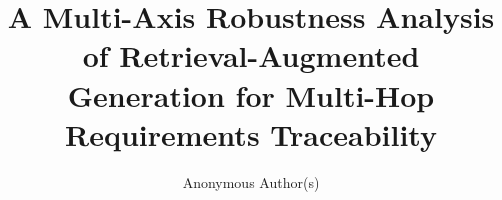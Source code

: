 \documentclass[runningheads]{llncs}
\begin{document}
\title{A Multi-Axis Robustness Analysis of Retrieval-Augmented Generation
  for Multi-Hop Requirements Traceability}

\author{Anonymous Author(s)}

\maketitle












\end{document}
